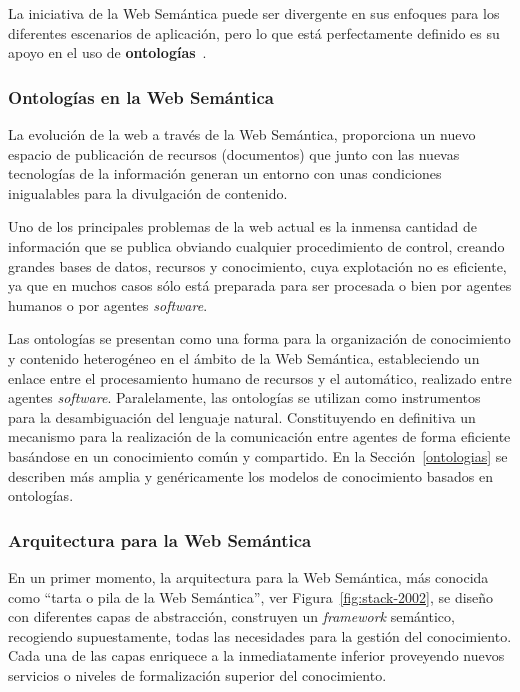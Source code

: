 La iniciativa de la Web Semántica puede ser divergente en sus enfoques para los
diferentes escenarios de aplicación, pero lo que está perfectamente definido
es su apoyo en el uso de \textbf{ontologías}~\cite{Sowa99knowledge}. 

\subsubsection{Ontologías en la Web Semántica}
La evolución de la web a través de la Web Semántica, proporciona un nuevo
espacio de publicación de recursos (documentos) que junto con las nuevas tecnologías de
la información generan un entorno con unas condiciones inigualables para la
divulgación de contenido.

Uno de los principales problemas de la web actual es la inmensa cantidad de
información que se publica obviando cualquier procedimiento de control, creando
grandes bases de datos, recursos y conocimiento, cuya explotación no es eficiente, ya que
en muchos casos sólo está preparada para ser procesada o bien por agentes
humanos o por agentes \textit{software}.

Las ontologías se presentan como una forma para la organización de conocimiento
y contenido heterogéneo en el ámbito de la Web Semántica, estableciendo un enlace entre el procesamiento humano de recursos y el
automático, realizado entre agentes \textit{software}. Paralelamente, las ontologías se utilizan como
instrumentos para la desambiguación del lenguaje natural. Constituyendo en definitiva un mecanismo para 
la realización de la comunicación entre agentes de forma eficiente
basándose en un conocimiento común y compartido. En la Sección~\ref{ontologias} se describen más amplia y genéricamente los modelos de conocimiento basados en ontologías.

\subsubsection{Arquitectura para la Web Semántica}\label{sect:arch-ws}
En un primer momento, la arquitectura para la Web Semántica, más conocida como
``tarta o pila de la Web Semántica'', ver Figura~\ref{fig:stack-2002}, se diseño con diferentes capas de abstracción, 
construyen un \textit{framework} semántico, recogiendo supuestamente, todas las necesidades para la gestión del
conocimiento. Cada una de las capas enriquece a la inmediatamente inferior
proveyendo nuevos servicios o niveles de formalización superior del conocimiento.

